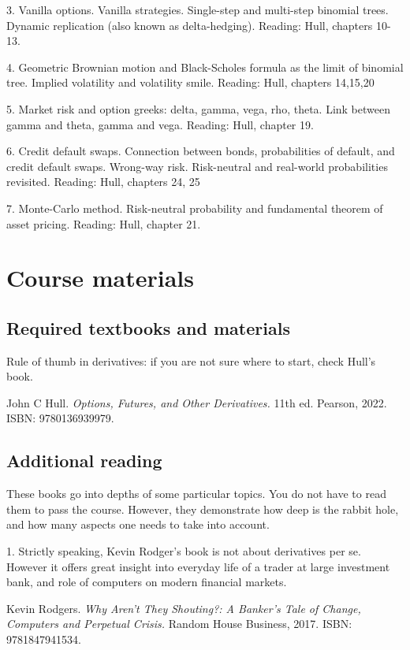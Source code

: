 \documentclass[a4paper,14pt]{extarticle}
\begin{document}
3. Vanilla options. Vanilla strategies. Single-step and multi-step binomial trees. Dynamic
replication (also known as delta-hedging).
Reading: Hull, chapters 10-13.

4. Geometric Brownian motion and Black-Scholes formula as the limit of binomial tree. Implied
volatility and volatility smile.
Reading: Hull, chapters 14,15,20

5. Market risk and option greeks: delta, gamma, vega, rho, theta. Link between gamma and theta,
gamma and vega.
Reading: Hull, chapter 19.

6. Credit default swaps. Connection between bonds, probabilities of default, and credit default
swaps. Wrong-way risk. Risk-neutral and real-world probabilities revisited.
Reading: Hull, chapters 24, 25

7. Monte-Carlo method. Risk-neutral probability and fundamental theorem of asset pricing.
Reading: Hull, chapter 21.

\section*{Course materials}

\subsection*{Required textbooks and materials}
Rule of thumb in derivatives: if you are not sure where to start, check Hull’s book.

John C Hull. \textit{Options, Futures, and Other Derivatives.} 11th ed. Pearson, 2022. ISBN:
9780136939979.

\subsection*{Additional reading}

These books go into depths of some particular topics. You do not have to read them to pass the
course. However, they demonstrate how deep is the rabbit hole, and how many aspects one
needs to take into account.

1. Strictly speaking, Kevin Rodger’s book is not about derivatives per se. However it offers great
insight into everyday life of a trader at large investment bank, and role of computers on modern
financial markets.

Kevin Rodgers. \textit{Why Aren't They Shouting?: A Banker’s Tale of Change, Computers and Perpetual
Crisis.} Random House Business, 2017. ISBN: 9781847941534.
\end{document}
